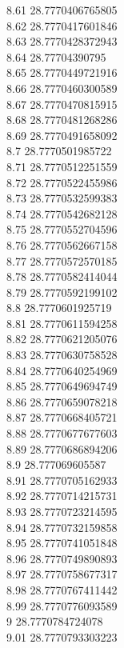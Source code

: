 {8.61	28.7770406765805\\
8.62	28.7770417601846\\
8.63	28.7770428372943\\
8.64	28.77704390795\\
8.65	28.7770449721916\\
8.66	28.7770460300589\\
8.67	28.7770470815915\\
8.68	28.7770481268286\\
8.69	28.7770491658092\\
8.7	28.7770501985722\\
8.71	28.7770512251559\\
8.72	28.7770522455986\\
8.73	28.7770532599383\\
8.74	28.7770542682128\\
8.75	28.7770552704596\\
8.76	28.7770562667158\\
8.77	28.7770572570185\\
8.78	28.7770582414044\\
8.79	28.7770592199102\\
8.8	28.7770601925719\\
8.81	28.7770611594258\\
8.82	28.7770621205076\\
8.83	28.7770630758528\\
8.84	28.7770640254969\\
8.85	28.7770649694749\\
8.86	28.7770659078218\\
8.87	28.7770668405721\\
8.88	28.7770677677603\\
8.89	28.7770686894206\\
8.9	28.777069605587\\
8.91	28.7770705162933\\
8.92	28.7770714215731\\
8.93	28.7770723214595\\
8.94	28.7770732159858\\
8.95	28.7770741051848\\
8.96	28.7770749890893\\
8.97	28.7770758677317\\
8.98	28.7770767411442\\
8.99	28.7770776093589\\
9	28.7770784724078\\
9.01	28.7770793303223\\
}
